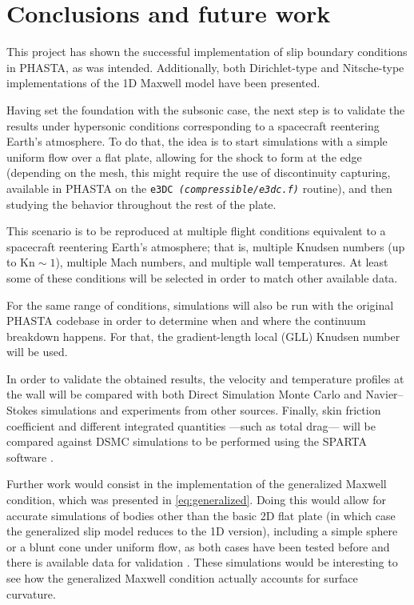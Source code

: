 \documentclass{ucb}
\begin{document}
\section{Conclusions and future work}

This project has shown the successful implementation of slip boundary conditions in PHASTA, as was intended. Additionally, both Dirichlet-type and Nitsche-type implementations of the 1D Maxwell model have been presented.

Having set the foundation with the subsonic case, the next step is to validate the results under hypersonic conditions corresponding to a spacecraft reentering Earth's atmosphere. To do that, the idea is to start simulations with a simple uniform flow over a flat plate, allowing for the shock to form at the edge (depending on the mesh, this might require the use of discontinuity capturing, available in PHASTA on the \texttt{e3DC \textit{(compressible/e3dc.f)}} routine), and then studying the behavior throughout the rest of the plate. 

This scenario is to be reproduced at multiple flight conditions equivalent to a spacecraft reentering Earth's atmosphere; that is, multiple Knudsen numbers (up to $\mathrm{Kn} \sim 1$), multiple Mach numbers, and multiple wall temperatures. At least some of these conditions will be selected in order to match other available data.

For the same range of conditions, simulations will also be run with the original PHASTA codebase in order to determine when and where the continuum breakdown happens. For that, the gradient-length local (GLL) Knudsen number \cite{boydSlip} will be used.

In order to validate the obtained results, the velocity and temperature profiles at the wall will be compared with both Direct Simulation Monte Carlo and Navier--Stokes simulations \cite{evaluation, gokcen1} and experiments \cite{boydExperiment, lockerbyCapturing} from other sources. Finally, skin friction coefficient and different integrated quantities ---such as total drag--- will be compared against DSMC simulations to be performed using the SPARTA software \cite{sparta}.

Further work would consist in the implementation of the generalized Maxwell condition, which was presented in \autoref{eq:generalized}. Doing this would allow for accurate simulations of bodies other than the basic 2D flat plate (in which case the generalized slip model reduces to the 1D version), including a simple sphere or a blunt cone under uniform flow, as both cases have been tested before and there is available data for validation \cite{computationBlunt, boydSlip, numerical, gokcen2}. These simulations would be interesting to see how the generalized Maxwell condition actually accounts for surface curvature.

\pagebreak

\ucbbib
\end{document}
